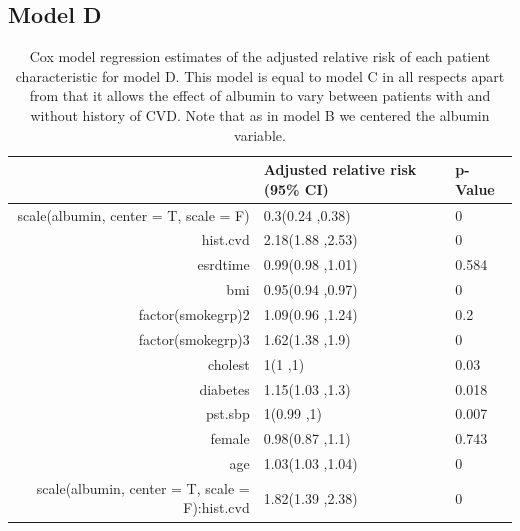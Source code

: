 \documentclass[paper=a4, fontsize=11pt]{scrartcl} %
\numberwithin{equation}{section} %
\numberwithin{figure}{section} %
\numberwithin{table}{section} %
\begin{document}
\subsection{Model D}
\begin{table}[H]
\centering
\begin{tabular}{rll}
  \hline
 & Adjusted relative risk (95\% CI) & p-Value \\ 
  \hline
scale(albumin, center = T, scale = F) & 0.3(0.24 ,0.38) & 0 \\ 
  hist.cvd & 2.18(1.88 ,2.53) & 0 \\ 
  esrdtime & 0.99(0.98 ,1.01) & 0.584 \\ 
  bmi & 0.95(0.94 ,0.97) & 0 \\ 
  factor(smokegrp)2 & 1.09(0.96 ,1.24) & 0.2 \\ 
  factor(smokegrp)3 & 1.62(1.38 ,1.9) & 0 \\ 
  cholest & 1(1 ,1) & 0.03 \\ 
  diabetes & 1.15(1.03 ,1.3) & 0.018 \\ 
  pst.sbp & 1(0.99 ,1) & 0.007 \\ 
  female & 0.98(0.87 ,1.1) & 0.743 \\ 
  age & 1.03(1.03 ,1.04) & 0 \\ 
  scale(albumin, center = T, scale = F):hist.cvd & 1.82(1.39 ,2.38) & 0 \\ 
   \hline
\end{tabular}
\caption{Cox model regression estimates of the adjusted relative risk of each patient characteristic for model D. This model is equal to model C in all respects apart from that it allows the effect of albumin to vary between patients with and without history of CVD. Note that as in model B we centered the albumin variable.}
\label{tab:model_d}
\end{table}
\end{document}
